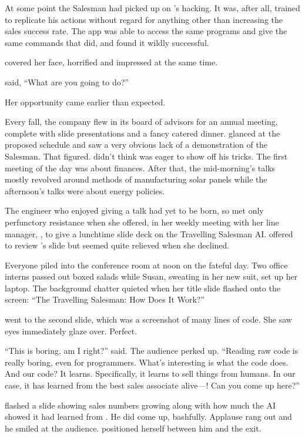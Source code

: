 At some point the Salesman had picked up on \energyJerk{}'s hacking. It was, after all, trained to replicate his actions without regard for anything other than increasing the sales success rate. The app was able to access the same programs and give the same commands that \energyJerk{} did, and found it wildly successful.

{\protag} covered her face, horrified and impressed at the same time.

{\sidetag} said, ``What are you going to do?''

\sectionBreak{}

Her opportunity came earlier than expected.

Every fall, the company flew in its board of advisors for an annual meeting, complete with slide presentations and a fancy catered dinner. {\protag} glanced at the proposed schedule and saw a very obvious lack of a demonstration of the Salesman. That figured. {\protag} didn't think \energyJerk{} was eager to show off his tricks. The first meeting of the day was about finances. After that, the mid-morning's talks mostly revolved around methods of manufacturing solar panels while the afternoon's talks were about energy policies.

The engineer who enjoyed giving a talk had yet to be born, so {\protag} met only perfunctory resistance when she offered, in her weekly meeting with her line manager, \Boss{}, to give a lunchtime slide deck on the Travelling Salesman AI. \Boss{} offered to review {\protag}'s slide but seemed quite relieved when she declined.

Everyone piled into the conference room at noon on the fateful day. Two office interns passed out boxed salads while Susan, sweating in her new suit, set up her laptop. The background chatter quieted when her title slide flashed onto the screen: ``The Travelling Salesman: How Does It Work?''

{\protag} went to the second slide, which was a screenshot of many lines of code. She saw eyes immediately glaze over. Perfect.

``This is boring, am I right?'' {\protag} said. The audience perked up. ``Reading raw code is really boring, even for programmers. What's interesting is what the code does. And our code? It learns. Specifically, it learns to sell things from humans. In our case, it has learned from the best sales associate alive---\energyJerk{}! Can you come up here?''

{\protag} flashed a slide showing sales numbers growing along with how much the AI showed it had learned from \energyJerk{}. He did come up, bashfully. Applause rang out and he smiled at the audience. {\protag} positioned herself between him and the exit.

